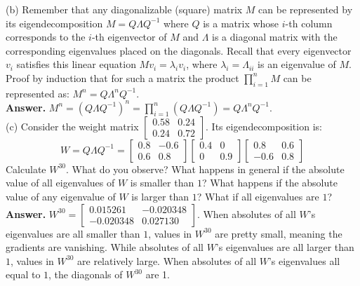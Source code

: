 \documentclass[12pt]{article}
\begin{document}
(b) Remember that any diagonalizable (square) matrix $M$ can be represented by its eigendecomposition $M=Q\Lambda Q^{-1}$  where $Q$ is a matrix whose $i$-th column corresponds to the $i$-th eigenvector of $M$ and $\Lambda$ is a diagonal matrix with the corresponding eigenvalues placed on the diagonals. Recall that every eigenvector $v_i$ satisfies this linear equation $M v_i = \lambda_i v_i$, where $\lambda_i = \Lambda_{ii}$ is an eigenvalue of $M$. Proof by induction that for such a matrix the product $\prod_{i=1}^n M$ can be represented as: $M^n = Q \Lambda^n Q^{-1}$.\\

\textcolor{ans}{\textbf{Answer.} $M^n=(Q\Lambda Q^{-1})^n=\prod_{i=1}^n(Q\Lambda Q^{-1}) =Q\Lambda^nQ^{-1}$.}\\

(c) Consider the weight matrix $\begin{bmatrix} 0.58 & 0.24 \\ 0.24 & 0.72 \end{bmatrix}$. Its eigendecomposition is:
\begin{equation*}
W = Q \Lambda Q^{-1} = \begin{bmatrix} 0.8 & -0.6 \\ 0.6 & 0.8 \end{bmatrix} \begin{bmatrix} 0.4 & 0 \\ 0 & 0.9 \end{bmatrix} \begin{bmatrix} 0.8 & 0.6 \\ -0.6 & 0.8 \end{bmatrix}
\end{equation*}
Calculate $W^{30}$. What do you observe? What happens in general if the absolute value of all eigenvalues of $W$ is smaller than $1$? What happens if the absolute value of any eigenvalue of $W$ is larger than $1$? What if all eigenvalues are $1$?\\

\textcolor{ans}{\textbf{Answer.} $W^{30}=\begin{bmatrix} 0.015261 & -0.020348 \\ -0.020348 & 0.027130 \end{bmatrix}$. When absolutes of all $W$'s eigenvalues are all smaller than $1$, values in $W^{30}$ are pretty small, meaning the gradients are vanishing. While absolutes of all $W$'s eigenvalues are all larger than $1$, values in $W^{30}$ are relatively large. When absolutes of all $W$'s eigenvalues all equal to $1$, the diagonals of $W^{30}$ are 1.}\\
\end{document}
